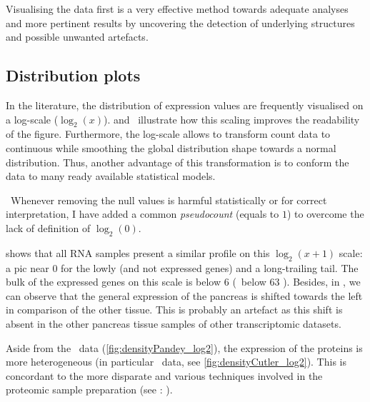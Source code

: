 Visualising the data first is a very effective method towards adequate analyses
and more pertinent results by uncovering
the detection of underlying structures and possible unwanted artefacts.

\subsection{Distribution plots}\label{subsec:distribPlot}

In the literature, the distribution of expression values are frequently
visualised on a log-scale ($\log_{2}(x)$).
 and~ illustrate how
this scaling improves the readability of the figure.
Furthermore, the log-scale allows to transform count data to continuous
while smoothing the global distribution shape towards a normal distribution.
Thus, another advantage of this transformation is to conform the data
to many ready available statistical models.

\NB\ Whenever removing the null values is harmful statistically
or for correct interpretation,
I have added a common \emph{pseudocount} (equals to $1$)
to overcome the lack of definition of $\log_{2}(0)$.

 shows that all \gls{RNA} samples present a similar
profile on this $\log_{2}(x+1)$ scale:
a pic near $0$ for the lowly (and not expressed genes) and a long-trailing tail.
The bulk of the expressed genes on this scale is below $6$ (\ie\ below 63 \FPKM).
Besides, in , we can observe that the general expression
of the pancreas is shifted towards the left in comparison of the other tissue.
This is probably an artefact as this shift is absent in the other pancreas
tissue samples of other transcriptomic datasets.

Aside from the \pandey\ data (\cref{fig:densityPandey_log2}),
the expression of the proteins is more heterogeneous
(in particular \cutler\ data, see \cref{fig:densityCutler_log2}).
This is concordant to the more disparate and various techniques involved in
the proteomic sample preparation (see :
).


